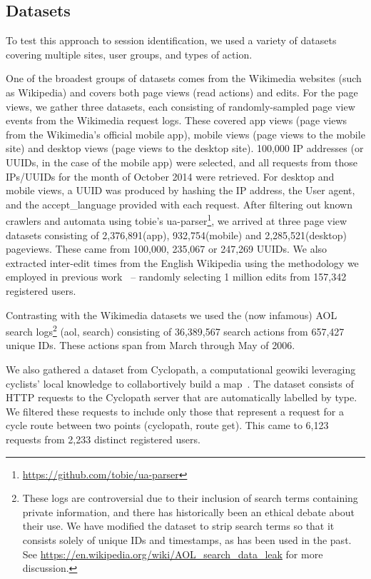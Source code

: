 \vskip 15pt
\subsection{Datasets}
To test this approach to session identification, we used a variety of datasets covering multiple sites, user groups, and types of action.

 One of the broadest groups of datasets comes from the Wikimedia websites (such as Wikipedia) and covers both page views (read actions) and edits. For the page views, we gather three datasets, each consisting of randomly-sampled page view events from the Wikimedia request logs. These covered app views (page views from the Wikimedia's official mobile app), mobile views (page views to the mobile site) and desktop views (page views to the desktop site). 100,000 IP addresses (or UUIDs, in the case of the mobile app) were selected, and all requests from those IPs/UUIDs for the month of October 2014 were retrieved. For desktop and mobile views, a UUID was produced by hashing the IP address, the User agent, and the accept\_language provided with each request. After filtering out known crawlers and automata using tobie's ua-parser\footnote{\url{https://github.com/tobie/ua-parser}}, we arrived at three page view datasets consisting of 2,376,891(app), 932,754(mobile) and 2,285,521(desktop) pageviews. These came from 100,000, 235,067 or 247,269 UUIDs. We also extracted inter-edit times from the English Wikipedia using the methodology we employed in previous work~\cite{geiger2013using} -- randomly selecting 1 million edits from 157,342 registered users.


 Contrasting with the Wikimedia datasets we used the (now infamous) AOL search logs\footnote{These logs are controversial due to their inclusion of search terms containing private information, and there has historically been an ethical debate about their use. We have modified the dataset to strip search terms so that it consists solely of unique IDs and timestamps, as has been used in the past.\cite{mehrzadi2012onextracting}  See \url{https://en.wikipedia.org/wiki/AOL_search_data_leak} for more discussion.} (aol, search) consisting of 36,389,567 search actions from 657,427 unique IDs. These actions span from March through May of 2006.

 We also gathered a dataset from Cyclopath, a computational geowiki leveraging cyclists' local knowledge to collabortively build a map~\cite{priedhorsky2008computational}.  The dataset consists of HTTP requests to the Cyclopath server that are automatically labelled by type.  We filtered these requests to include only those that represent a request for a cycle route between two points (cyclopath, route get). This came to 6,123 requests from 2,233 distinct registered users.

